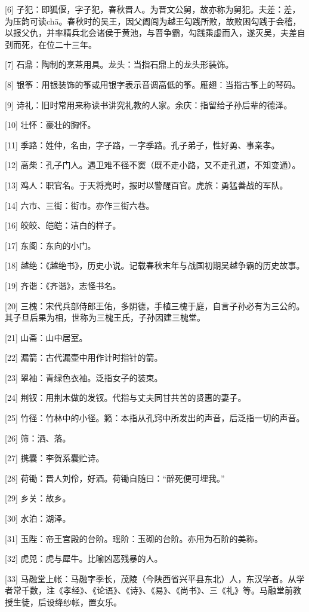 \documentclass[12pt,UTF8]{ctexbook}
\begin{document}
[6] 子犯：即狐偃，字子犯，春秋晋人。为晋文公舅，故亦称为舅犯。夫差：差，为压韵可读chā。春秋时的吴王，因父阖闾为越王勾践所败，故败困勾践于会稽，以报父仇，并率精兵北会诸侯于黄池，与晋争霸，勾践乘虚而入，遂灭吴，夫差自刭而死，在位二十三年。

[7] 石鼎：陶制的烹茶用具。龙头：当指石鼎上的龙头形装饰。

[8] 银筝：用银装饰的筝或用银字表示音调高低的筝。雁翅：当指古筝上的琴码。

[9] 诗礼：旧时常用来称读书讲究礼教的人家。余庆：指留给子孙后辈的德泽。

[10] 壮怀：豪壮的胸怀。

[11] 季路：姓仲，名由，字子路，一字季路。孔子弟子，性好勇、事亲孝。

[12] 高柴：孔子门人。遇卫难不径不窦（既不走小路，又不走孔道，不知变通）。

[13] 鸡人：职官名。于天将亮时，报时以警醒百官。虎旅：勇猛善战的军队。

[14] 六市、三街：街市。亦作三街六巷。


[16] 皎皎、皑皑：洁白的样子。

[17] 东阁：东向的小门。

[18] 越绝：《越绝书》，历史小说。记载春秋末年与战国初期吴越争霸的历史故事。

[19] 齐谐：《齐谐》，志怪书名。

[20] 三槐：宋代兵部侍郎王佑，多阴德，手植三槐于庭，自言子孙必有为三公的。其子旦后果为相，世称为三槐王氏，子孙因建三槐堂。

[21] 山斋：山中居室。

[22] 漏箭：古代漏壶中用作计时指针的箭。

[23] 翠袖：青绿色衣袖。泛指女子的装束。

[24] 荆钗：用荆木做的发钗。代指与丈夫同甘共苦的贤惠的妻子。

[25] 竹径：竹林中的小径。籁：本指从孔窍中所发出的声音，后泛指一切的声音。

[26] 筛：洒、落。

[27] 携囊：李贺系囊贮诗。

[28] 荷锄：晋人刘伶，好酒。荷锄自随曰：“醉死便可埋我。”

[29] 乡关：故乡。

[30] 水泊：湖泽。

[31] 玉陛：帝王宫殿的台阶。瑶阶：玉砌的台阶。亦用为石阶的美称。

[32] 虎兕：虎与犀牛。比喻凶恶残暴的人。

[33] 马融堂上帐：马融字季长，茂陵（今陕西省兴平县东北）人，东汉学者。从学者常千数，注《孝经》、《论语》、《诗》、《易》、《尚书》、三《礼》等。马融堂前教授生徒，后设绛纱帐，置女乐。
\end{document}
